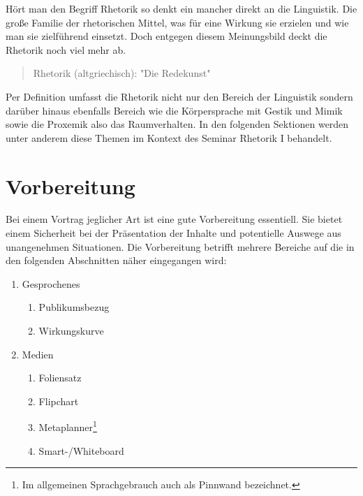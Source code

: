 \documentclass[../main.tex]{subfiles}
\begin{document}
    
    Hört man den Begriff Rhetorik so denkt ein mancher direkt an die Linguistik. Die große Familie der rhetorischen Mittel, was für eine Wirkung sie erzielen und wie man sie zielführend einsetzt. Doch entgegen diesem Meinungsbild deckt die Rhetorik noch viel mehr ab.
    \begin{quote}
        Rhetorik (altgriechisch): "Die Redekunst"
    \end{quote}
    Per Definition umfasst die Rhetorik nicht nur den Bereich der Linguistik sondern darüber hinaus ebenfalls Bereich wie die Körpersprache mit Gestik und Mimik sowie die Proxemik also das Raumverhalten. In den folgenden Sektionen werden unter anderem diese Themen im Kontext des Seminar Rhetorik I behandelt.
    
    \clearpage
    
    \section{Vorbereitung}
        Bei einem Vortrag jeglicher Art ist eine gute Vorbereitung essentiell. Sie bietet einem Sicherheit bei der Präsentation der Inhalte und potentielle Auswege aus unangenehmen Situationen. Die Vorbereitung betrifft mehrere Bereiche auf die in den folgenden Abschnitten näher eingegangen wird:
        \begin{enumerate}
            \item Gesprochenes
            \begin{enumerate}
                \item Publikumsbezug
                \item Wirkungskurve
            \end{enumerate}
            \item Medien
            \begin{enumerate}
                \item Foliensatz
                \item Flipchart
                \item Metaplanner\footnote{Im allgemeinen Sprachgebrauch auch als Pinnwand bezeichnet.}
                \item Smart-/Whiteboard
            \end{enumerate}
        \end{enumerate}
        
\end{document}
